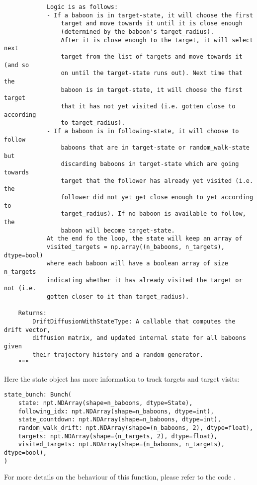 \documentclass[
    article,
    oneside,
]{memoir}
\begin{document}
\begin{verbatim}
            Logic is as follows:
            - If a baboon is in target-state, it will choose the first
                target and move towards it until it is close enough
                (determined by the baboon's target_radius).
                After it is close enough to the target, it will select next
                target from the list of targets and move towards it (and so
                on until the target-state runs out). Next time that the
                baboon is in target-state, it will choose the first target
                that it has not yet visited (i.e. gotten close to according
                to target_radius).
            - If a baboon is in following-state, it will choose to follow
                baboons that are in target-state or random_walk-state but
                discarding baboons in target-state which are going towards
                target that the follower has already yet visited (i.e. the
                follower did not yet get close enough to yet according to
                target_radius). If no baboon is available to follow, the
                baboon will become target-state.
            At the end fo the loop, the state will keep an array of
            visited_targets = np.array((n_baboons, n_targets), dtype=bool)
            where each baboon will have a boolean array of size n_targets
            indicating whether it has already visited the target or not (i.e.
            gotten closer to it than target_radius).

    Returns:
        DriftDiffusionWithStateType: A callable that computes the drift vector,
        diffusion matrix, and updated internal state for all baboons given
        their trajectory history and a random generator.
    """
\end{verbatim}

Here the state object has more information to track targets and target visits:
\begin{verbatim}
state_bunch: Bunch(
    state: npt.NDArray(shape=n_baboons, dtype=State),
    following_idx: npt.NDArray(shape=n_baboons, dtype=int),
    state_countdown: npt.NDArray(shape=n_baboons, dtype=int),
    random_walk_drift: npt.NDArray(shape=(n_baboons, 2), dtype=float),
    targets: npt.NDArray(shape=(n_targets, 2), dtype=float),
    visited_targets: npt.NDArray(shape=(n_baboons, n_targets), dtype=bool),
)
\end{verbatim}

For more details on the behaviour of this function, please refer to the code \cite{github:baboon-simulation}.

\printbibliography
\end{document}
